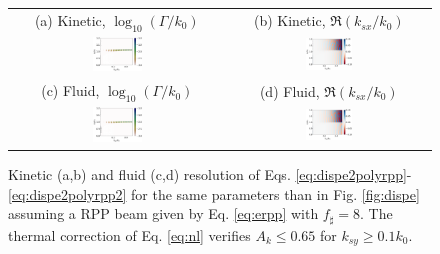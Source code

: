 \documentclass[
 reprint,
 superscriptaddress,
 amsmath,amssymb,
 aps,
]{revtex4-1}
\begin{document}
 \begin{figure}
\begin{tabular}{cc}
(a) Kinetic, $\log_{10}(\Gamma/k_0)$ &
(b)  Kinetic, $\Re(k_{sx}/k_0)$ \\
\includegraphics[width=0.24\textwidth]{gkH300.eps}&
\includegraphics[width=0.24\textwidth]{kkH300.eps}\\
(c) Fluid, $\log_{10}(\Gamma/k_0)$  &
(d) Fluid, $\Re(k_{sx}/k_0)$  \\
\includegraphics[width=0.24\textwidth]{gfH300.eps}&
\includegraphics[width=0.24\textwidth]{kfH300.eps}
\end{tabular}
\caption{ \label{fig:disperpp}  
Kinetic (a,b) and fluid (c,d) resolution of Eqs. \eqref{eq:dispe2polyrpp}-\eqref{eq:dispe2polyrpp2} for  the same parameters than in Fig. \ref{fig:dispe} assuming a RPP beam given by Eq. \eqref{eq:erpp} with $f_\sharp=8$. The thermal correction of Eq. \eqref{eq:nl} verifies $A_k\le 0.65$ for $k_{sy}\ge 0.1k_0$.
 }
\end{figure}
\end{document}
